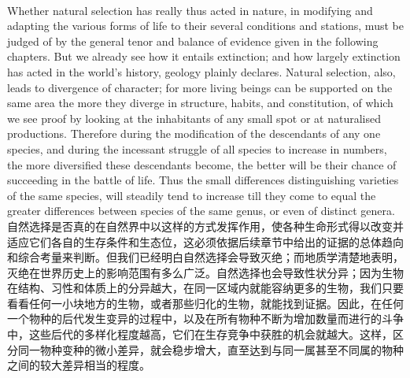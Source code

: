 \documentclass{article}
\begin{document}
\\
Whether natural selection has really thus acted in nature, in modifying and adapting the various forms of life to their several conditions and stations, must be judged of by the general tenor and balance of evidence given in the following chapters. But we already see how it entails extinction; and how largely extinction has acted in the world’s history, geology plainly declares. Natural selection, also, leads to divergence of character; for more living beings can be supported on the same area the more they diverge in structure, habits, and constitution, of which we see proof by looking at the inhabitants of any small spot or at naturalised productions. Therefore during the modification of the descendants of any one species, and during the incessant struggle of all species to increase in numbers, the more diversified these descendants become, the better will be their chance of succeeding in the battle of life. Thus the small differences distinguishing varieties of the same species, will steadily tend to increase till they come to equal the greater differences between species of the same genus, or even of distinct genera.\\
自然选择是否真的在自然界中以这样的方式发挥作用，使各种生命形式得以改变并适应它们各自的生存条件和生态位，这必须依据后续章节中给出的证据的总体趋向和综合考量来判断。但我们已经明白自然选择会导致灭绝；而地质学清楚地表明，灭绝在世界历史上的影响范围有多么广泛。自然选择也会导致性状分异；因为生物在结构、习性和体质上的分异越大，在同一区域内就能容纳更多的生物，我们只要看看任何一小块地方的生物，或者那些归化的生物，就能找到证据。因此，在任何一个物种的后代发生变异的过程中，以及在所有物种不断为增加数量而进行的斗争中，这些后代的多样化程度越高，它们在生存竞争中获胜的机会就越大。这样，区分同一物种变种的微小差异，就会稳步增大，直至达到与同一属甚至不同属的物种之间的较大差异相当的程度。 \\
\end{document}
